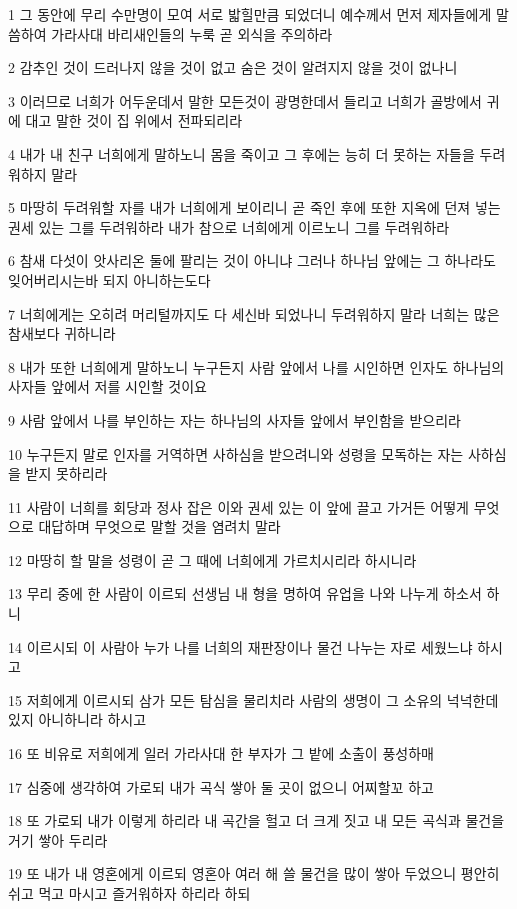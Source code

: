 \par 1 그 동안에 무리 수만명이 모여 서로 밟힐만큼 되었더니 예수께서 먼저 제자들에게 말씀하여 가라사대 바리새인들의 누룩 곧 외식을 주의하라
\par 2 감추인 것이 드러나지 않을 것이 없고 숨은 것이 알려지지 않을 것이 없나니
\par 3 이러므로 너희가 어두운데서 말한 모든것이 광명한데서 들리고 너희가 골방에서 귀에 대고 말한 것이 집 위에서 전파되리라
\par 4 내가 내 친구 너희에게 말하노니 몸을 죽이고 그 후에는 능히 더 못하는 자들을 두려워하지 말라
\par 5 마땅히 두려워할 자를 내가 너희에게 보이리니 곧 죽인 후에 또한 지옥에 던져 넣는 권세 있는 그를 두려워하라 내가 참으로 너희에게 이르노니 그를 두려워하라
\par 6 참새 다섯이 앗사리온 둘에 팔리는 것이 아니냐 그러나 하나님 앞에는 그 하나라도 잊어버리시는바 되지 아니하는도다
\par 7 너희에게는 오히려 머리털까지도 다 세신바 되었나니 두려워하지 말라 너희는 많은 참새보다 귀하니라
\par 8 내가 또한 너희에게 말하노니 누구든지 사람 앞에서 나를 시인하면 인자도 하나님의 사자들 앞에서 저를 시인할 것이요
\par 9 사람 앞에서 나를 부인하는 자는 하나님의 사자들 앞에서 부인함을 받으리라
\par 10 누구든지 말로 인자를 거역하면 사하심을 받으려니와 성령을 모독하는 자는 사하심을 받지 못하리라
\par 11 사람이 너희를 회당과 정사 잡은 이와 권세 있는 이 앞에 끌고 가거든 어떻게 무엇으로 대답하며 무엇으로 말할 것을 염려치 말라
\par 12 마땅히 할 말을 성령이 곧 그 때에 너희에게 가르치시리라 하시니라
\par 13 무리 중에 한 사람이 이르되 선생님 내 형을 명하여 유업을 나와 나누게 하소서 하니
\par 14 이르시되 이 사람아 누가 나를 너희의 재판장이나 물건 나누는 자로 세웠느냐 하시고
\par 15 저희에게 이르시되 삼가 모든 탐심을 물리치라 사람의 생명이 그 소유의 넉넉한데 있지 아니하니라 하시고
\par 16 또 비유로 저희에게 일러 가라사대 한 부자가 그 밭에 소출이 풍성하매
\par 17 심중에 생각하여 가로되 내가 곡식 쌓아 둘 곳이 없으니 어찌할꼬 하고
\par 18 또 가로되 내가 이렇게 하리라 내 곡간을 헐고 더 크게 짓고 내 모든 곡식과 물건을 거기 쌓아 두리라
\par 19 또 내가 내 영혼에게 이르되 영혼아 여러 해 쓸 물건을 많이 쌓아 두었으니 평안히 쉬고 먹고 마시고 즐거워하자 하리라 하되
